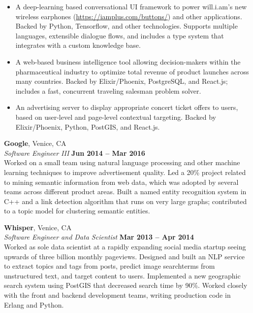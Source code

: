 \documentclass[margin,line]{resume}
\begin{document}
\begin{resume}
    \begin{itemize}
    \item A deep-learning based conversational UI framework to power
      will.i.am's new wireless earphones (\url{https://iamplus.com/buttons/})
      and other applications. Backed by Python, Tensorflow, and other
      technologies. Supports multiple languages, extensible dialogue flows, and
      includes a type system that integrates with a custom knowledge base.
    \item A web-based business intelligence tool allowing decision-makers
      within the pharmaceutical industry to optimize total revenue of product
      launches across many countries. Backed by Elixir/Phoenix, PostgreSQL, and
      React.js; includes a fast, concurrent traveling salesman problem solver.
    \item An advertising server to display appropriate concert ticket offers
      to users, based on user-level and page-level contextual targeting. Backed
      by Elixir/Phoenix, Python, PostGIS, and React.js.
    \end{itemize}

    \textbf{Google}, Venice, CA \vspace{2mm}\\\vspace{1mm}%
    \textsl{Software Engineer III} \hfill \textbf{Jun 2014 -- Mar 2016}\\
    Worked on a small team using natural language processing and other machine
    learning techniques to improve advertisement quality. Led a 20\% project
    related to mining semantic information from web data, which was adopted by
    several teams across different product areas. Built a named entity
    recognition system in C++ and a link detection algorithm that runs on very
    large graphs; contributed to a topic model for clustering semantic entities.

    \textbf{Whisper}, Venice, CA \vspace{2mm}\\\vspace{1mm}%
    \textsl{Software Engineer and Data Scientist} \hfill \textbf{Mar 2013 -- Apr 2014}\\
    Worked as sole data scientist at a rapidly expanding social media startup
    seeing upwards of three billion monthly pageviews. Designed and built an NLP
    service to extract topics and tags from posts, predict image searchterms
    from unstructured text, and target content to users. Implemented a new
    geographic search system using PostGIS that decreased search time by
    90\%. Worked closely with the front and backend development teams, writing
    production code in Erlang and Python.


\end{resume}
\end{document}
